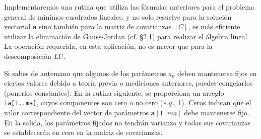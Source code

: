 \documentclass[10pt,a4paper]{book}
\begin{document}
Implementaremos una rutina que utiliza las fórmulas anteriores para el problema general de mínimos cuadrados lineales, y no solo resuelve para la solución vectorial $\mathbf{a}$ sino también para la matriz de covarianzas $[C]$, es más eficiente utilizar la eliminación de Gauss-Jordan (cf. §2.1) para realizar el álgebra lineal. La operación requerida, en esta aplicación, no es mayor que para la descomposición $LU$.

Si sabes de antemano que algunos de los parámetros $a_k$ deben mantenerse fijos en ciertos valores debido a teoría previa o mediciones anteriores, puedes congelarlos (ponerlos constantes). En la rutina siguiente, se proporciona un arreglo \verb|ia[1..ma]|, cuyos componentes son cero o no cero (\textit{e.g.}, 1). Ceros indican que el valor correspondiente del vector de parámetros $\mathbf{a}[1..ma]$ debe mantenerse fijo. En la salida, los parámetros fijados no tendrán varianza y todas sus covarianzas se establecerán en cero en la matriz de covarianzas.

\newpage
\end{document}
